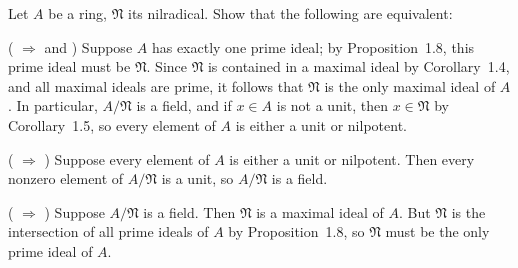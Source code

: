 \begin{exercise}
Let \(A\) be a ring, \(\mathfrak N\) its nilradical.
Show that the following are equivalent:
\end{exercise}

\begin{solution}
( \(\Rightarrow\)  and )
Suppose \(A\) has exactly one prime ideal; by Proposition~1.8, this prime ideal must be \(\mathfrak{N}\).
Since \(\mathfrak{N}\) is contained in a maximal ideal by Corollary~1.4, and all maximal ideals are prime, it follows that \(\mathfrak{N}\) is the only maximal ideal of \(A\).
In particular, \(A / \mathfrak{N}\) is a field, and if \(x \in A\) is not a unit, then \(x \in \mathfrak{N}\) by Corollary~1.5, so every element of \(A\) is either a unit or nilpotent.

( \(\Rightarrow\) )
Suppose every element of \(A\) is either a unit or nilpotent.
Then every nonzero element of \(A / \mathfrak{N}\) is a unit, so \(A / \mathfrak{N}\) is a field.

( \(\Rightarrow\) )
Suppose \(A / \mathfrak{N}\) is a field.
Then \(\mathfrak{N}\) is a maximal ideal of \(A\).
But \(\mathfrak{N}\) is the intersection of all prime ideals of \(A\) by Proposition~1.8, so \(\mathfrak{N}\) must be the only prime ideal of \(A\).
\end{solution}